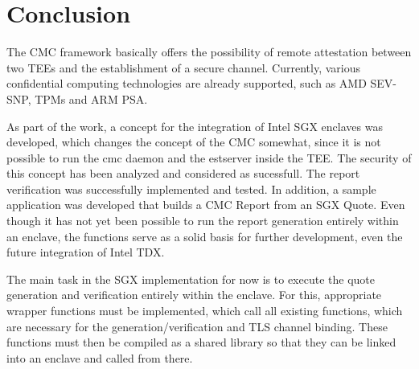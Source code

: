 
\chapter{Conclusion}\label{chapter:conclusion}


The CMC framework basically offers the possibility of remote attestation between two TEEs and the establishment of a secure channel. Currently, various confidential computing technologies are already supported, such as AMD SEV-SNP, TPMs and ARM PSA.

As part of the work, a concept for the integration of Intel SGX enclaves was developed, which changes the concept of the CMC somewhat, since it is not possible to run the cmc daemon and the estserver inside the TEE. The security of this concept has been analyzed and considered as sucessfull.
The report verification was successfully implemented and tested. In addition, a sample application was developed that builds a CMC Report from an SGX Quote. 
Even though it has not yet been possible to run the report generation entirely within an enclave, the functions serve as a solid basis for further development, even the future integration of Intel TDX. 

The main task in the SGX implementation for now is to execute the quote generation and verification entirely within the enclave. For this, appropriate wrapper functions must be implemented, which call all existing functions, which are necessary for the generation/verification and TLS channel binding. These functions must then be compiled as a shared library so that they can be linked into an enclave and called from there. 
